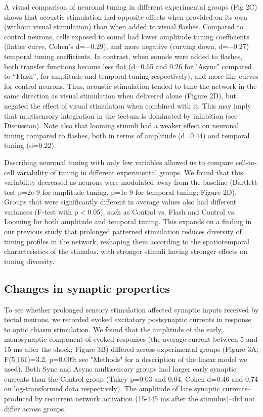 \documentclass{article}
\begin{document}
A visual comparison of neuronal tuning in different experimental groups (Fig 2C) shows that acoustic stimulation had opposite effects when provided on its own (without visual stimulation) than when added to visual flashes. Compared to control neurons, cells exposed to sound had lower amplitude tuning coefficients (flatter curve, Cohen’s d=$-$0.29), and more negative (curving down, d=$-$0.27) temporal tuning coefficients. In contrast, when sounds were added to flashes, both transfer functions became less flat (d=0.65 and 0.26 for "Async" compared to “Flash”, for amplitude and temporal tuning respectively), and more like curves for control neurons. Thus, acoustic stimulation tended to tune the network in the same direction as visual stimulation when delivered alone (Figure 2D), but negated the effect of visual stimulation when combined with it. This may imply that multisensory integration in the tectum is dominated by inhibition (see Discussion). Note also that looming stimuli had a weaker effect on neuronal tuning compared to flashes, both in terms of amplitude (d=0.44) and temporal tuning (d=0.22).

Describing neuronal tuning with only few variables allowed us to compare cell-to-cell variability of tuning in different experimental groups. We found that this variability decreased as neurons were modulated away from the baseline (Bartlett test p=2e-9 for amplitude tuning, p=1e-9 for temporal tuning; Figure 2D). Groups that were significantly different in average values also had different variances (F-test with p$<$0.05), such as Control vs. Flash and Control vs. Looming for both amplitude and temporal tuning. This expands on a finding in our previous study \citep{ciarleglio2015} that prolonged patterned stimulation reduces diversity of tuning profiles in the network, reshaping them according to the spatiotemporal characteristics of the stimulus, with stronger stimuli having stronger effects on tuning diversity.

\subsection*{Changes in synaptic properties}

To see whether prolonged sensory stimulation affected synaptic inputs received by tectal neurons, we recorded evoked excitatory postsynaptic currents in response to optic chiasm stimulation. We found that the amplitude of the early, monosynaptic component of evoked responses (the average current between 5 and 15 ms after the shock; Figure 3B) differed across experimental groups (Figure 3A; F(5,161)=3.2, p=0.009; see "Methods" for a description of the linear model we used). Both Sync and Async multisensory groups had larger early synaptic currents than the Control group (Tukey p=0.03 and 0.04; Cohen d=0.46 and 0.74 on log-transformed data respectively). The amplitude of late synaptic currents–produced by recurrent network activation (15-145 ms after the stimulus)–did not differ across groups.
\end{document}
